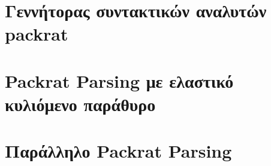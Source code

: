 \documentclass{beamer}
\begin{document}
\section{Γεννήτορας συντακτικών αναλυτών packrat}

\begin{frame}
  \frametitle{}
\end{frame}

\begin{frame}
  \frametitle{}
\end{frame}

\begin{frame}
  \frametitle{}
\end{frame}

\begin{frame}
  \frametitle{}
\end{frame}

\begin{frame}
  \frametitle{}
\end{frame}

\section{Packrat Parsing με ελαστικό κυλιόμενο παράθυρο}

\begin{frame}
  \frametitle{}
\end{frame}

\begin{frame}
  \frametitle{}
\end{frame}

\begin{frame}
  \frametitle{}
\end{frame}

\begin{frame}
  \frametitle{}
\end{frame}

\begin{frame}
  \frametitle{}
\end{frame}

\section{Παράλληλο Packrat Parsing}

\begin{frame}
  \frametitle{}
\end{frame}

\begin{frame}
  \frametitle{}
\end{frame}
\end{document}
